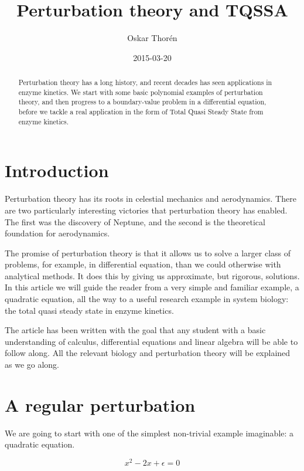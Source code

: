 \documentclass[12pt]{article}
\title{Perturbation theory and TQSSA}
\author{Oskar Thor\'{e}n}
\date{2015-03-20}
\begin{document}
\nocite{*} %
\maketitle

\begin{abstract}
Perturbation theory has a long history, and recent decades has seen applications
in enzyme kinetics. We start with some basic polynomial examples of perturbation
theory, and then progress to a boundary-value problem in a differential
equation, before we tackle a real application in the form of Total Quasi Steady
State from enzyme kinetics.
\end{abstract}

\clearpage
\tableofcontents
\clearpage

\section{Introduction}

Perturbation theory has its roots in celestial mechanics and
aerodynamics. There are two particularly interesting victories that
perturbation theory has enabled. The first was the discovery of
Neptune, and the second is the theoretical foundation for
aerodynamics.

The promise of perturbation theory is that it allows us to solve a
larger class of problems, for example, in differential equation, than
we could otherwise with analytical methods. It does this by giving us
approximate, but rigorous, solutions. In this article we will guide
the reader from a very simple and familiar example, a quadratic
equation, all the way to a useful research example in system biology:
the total quasi steady state in enzyme kinetics.

The article has been written with the goal that any student with a basic
understanding of calculus, differential equations and linear algebra will be
able to follow along. All the relevant biology and perturbation theory will be
explained as we go along.

\section{A regular perturbation}

We are going to start with one of the simplest non-trivial example imaginable:
a quadratic equation.

\begin{equation}
x^2 - 2x + \epsilon = 0
\end{equation}
\end{document}
